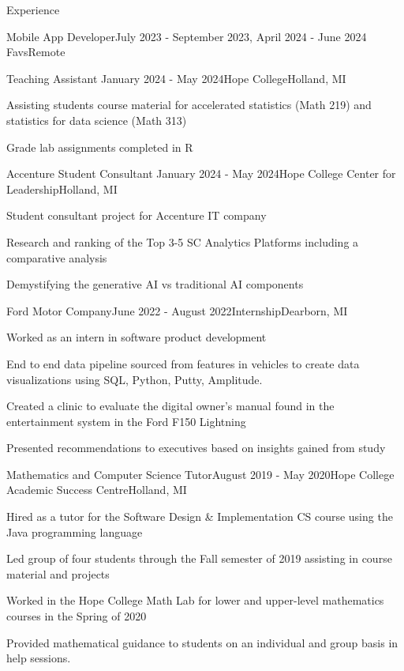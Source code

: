 \documentclass[
	11pt, %
]{resume} %
\begin{document}
\begin{rSection}{Experience}
\begin{rSubsection}{Mobile App Developer}{July 2023 - September 2023, April 2024 - June 2024 }{Favs}{Remote}
	\end{rSubsection}

	\begin{rSubsection}{Teaching Assistant}{ January 2024 - May 2024}{Hope College}{Holland, MI}
    \item Assisting students course material for accelerated statistics (Math 219) and statistics for data science (Math 313)
    \item Grade lab assignments completed in R
	\end{rSubsection}

	\begin{rSubsection}{Accenture Student Consultant}{ January 2024 - May 2024}{Hope College Center for Leadership}{Holland, MI}
    \item Student consultant project for Accenture IT company 
    \item Research and ranking of the Top 3-5 SC Analytics Platforms including a comparative analysis
    \item Demystifying the generative AI vs traditional AI components
	\end{rSubsection}



	\begin{rSubsection}{Ford Motor Company}{June 2022 - August 2022}{Internship}{Dearborn, MI}

  \item Worked as an intern in software product development  
  \item End to end data pipeline sourced from features in vehicles to create data visualizations using SQL, Python, Putty, Amplitude.
  \item  Created a clinic to evaluate the digital owner's manual found in the entertainment system in the Ford F150 Lightning
  \item Presented recommendations to executives based on insights gained from study
	\end{rSubsection}


  \begin{rSubsection}{ Mathematics and Computer Science Tutor}{August 2019 - May 2020}{Hope College Academic Success Centre}{Holland, MI}
    \item Hired as a tutor for the Software Design \& Implementation CS course using the Java programming language
    \item Led group of four students through the Fall semester of 2019 assisting in course material and projects
    \item Worked in the Hope College Math Lab for lower and upper-level mathematics courses in the Spring of 2020
    \item  Provided mathematical guidance to students on an individual and group basis in help sessions.
	\end{rSubsection}


\end{rSection}
\end{document}
